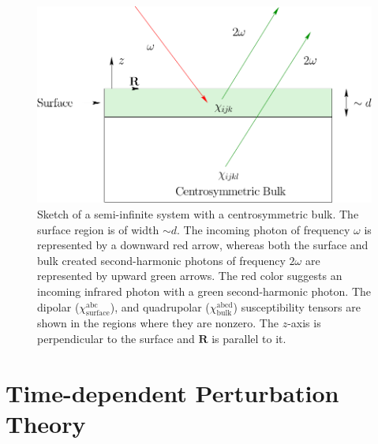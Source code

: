 \begin{figure}[t]
\centering
\includegraphics[scale=0.6]{content/figures/diag-system}
\caption{Sketch of a semi-infinite system with a centrosymmetric bulk. The
surface region is of width $\sim d$. The incoming photon of frequency $\omega$
is represented by a downward red arrow, whereas both the surface and bulk
created second-harmonic photons of frequency $2\omega$ are represented by upward
green arrows. The red color suggests an incoming infrared photon with a green
second-harmonic photon. The dipolar ($\chi^{\mathrm{abc}}_{\mathrm{surface}}$),
and quadrupolar ($\chi^{\mathrm{abcd}}_{\mathrm{bulk}}$) susceptibility tensors
are shown in the regions where they are nonzero. The $z$-axis is perpendicular
to the surface and $\mathbf{R}$ is parallel to it.}
\label{fsystem}
\end{figure}



\section{Time-dependent Perturbation Theory}\label{tdpt}

